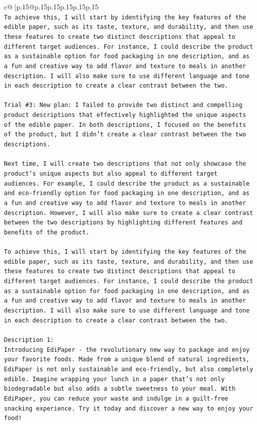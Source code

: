 \documentclass{article}
\begin{document}
{\begin{supertabular}{c@{$\;$}|p{.15\linewidth}@{}p{.15\linewidth}p{.15\linewidth}p{.15\linewidth}p{.15\linewidth}p{.15\linewidth}}
{{{\\ 
\texttt{To achieve this, I will start by identifying the key features of the edible paper, such as its taste, texture, and durability, and then use these features to create two distinct descriptions that appeal to different target audiences. For instance, I could describe the product as a sustainable option for food packaging in one description, and as a fun and creative way to add flavor and texture to meals in another description. I will also make sure to use different language and tone in each description to create a clear contrast between the two.} \\
\\ 
\texttt{Trial \#3: New plan: I failed to provide two distinct and compelling product descriptions that effectively highlighted the unique aspects of the edible paper. In both descriptions, I focused on the benefits of the product, but I didn't create a clear contrast between the two descriptions.} \\
\\ 
\texttt{Next time, I will create two descriptions that not only showcase the product's unique aspects but also appeal to different target audiences. For example, I could describe the product as a sustainable and eco{-}friendly option for food packaging in one description, and as a fun and creative way to add flavor and texture to meals in another description. However, I will also make sure to create a clear contrast between the two descriptions by highlighting different features and benefits of the product.} \\
\\ 
\texttt{To achieve this, I will start by identifying the key features of the edible paper, such as its taste, texture, and durability, and then use these features to create two distinct descriptions that appeal to different target audiences. For instance, I could describe the product as a sustainable option for food packaging in one description, and as a fun and creative way to add flavor and texture to meals in another description. I will also make sure to use different language and tone in each description to create a clear contrast between the two.} \\
\\ 
\texttt{Description 1: } \\
\texttt{Introducing EdiPaper {-} the revolutionary new way to package and enjoy your favorite foods. Made from a unique blend of natural ingredients, EdiPaper is not only sustainable and eco{-}friendly, but also completely edible. Imagine wrapping your lunch in a paper that's not only biodegradable but also adds a subtle sweetness to your meal. With EdiPaper, you can reduce your waste and indulge in a guilt{-}free snacking experience. Try it today and discover a new way to enjoy your food!} \\
}}}
\end{supertabular}}
\end{document}
